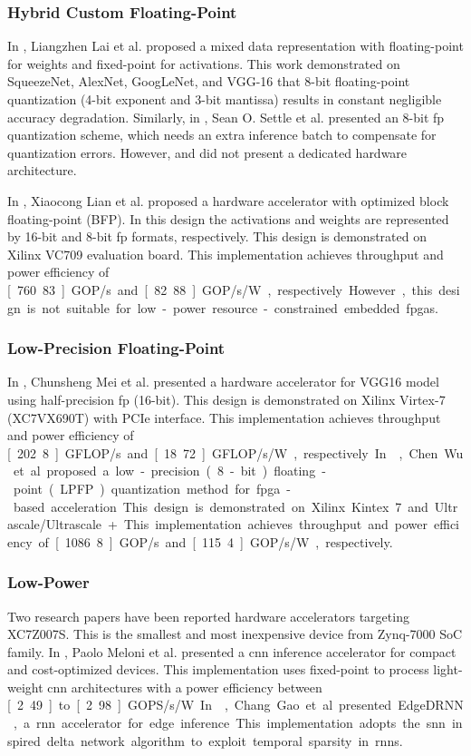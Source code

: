 \subsubsection{Hybrid Custom Floating-Point}
In \cite{lai2017deep}, Liangzhen Lai et al. proposed a mixed data representation with floating-point for weights and fixed-point for activations. This work demonstrated on SqueezeNet, AlexNet, GoogLeNet, and VGG-16 that 8-bit floating-point quantization (4-bit exponent and 3-bit mantissa) results in constant negligible accuracy degradation. Similarly, in \cite{settle2018quantizing}, Sean O. Settle et al. presented an 8-bit \gls{fp} quantization scheme, which needs an extra inference batch to compensate for quantization errors. However, \cite{lai2017deep} and \cite{settle2018quantizing} did not present a dedicated hardware architecture.

In \cite{lian2019high}, Xiaocong Lian et al. proposed a hardware accelerator with optimized block floating-point (BFP). In this design the activations and weights are represented by 16-bit and 8-bit \gls{fp} formats, respectively. This design is demonstrated on Xilinx VC709 evaluation board. This implementation achieves throughput and power efficiency of \unit[760.83]{GOP/s} and \unit[82.88]{GOP/s/W}, respectively. However, this design is not suitable for low-power resource-constrained embedded \glspl{fpga}.

\subsubsection{Low-Precision Floating-Point}
In \cite{mei2017200mhz}, Chunsheng Mei et al. presented a hardware accelerator for VGG16 model using half-precision \gls{fp} (16-bit). This design is demonstrated on Xilinx Virtex-7 (XC7VX690T) with PCIe interface. This implementation achieves throughput and power efficiency of \unit[202.8]{GFLOP/s} and \unit[18.72]{GFLOP/s/W}, respectively. In \cite{wu2021low}, Chen Wu et al. proposed a low-precision (8-bit) floating-point (LPFP) quantization method for \gls{fpga}-based acceleration. This design is demonstrated on Xilinx Kintex 7 and Ultrascale/Ultrascale+. This implementation achieves throughput and power efficiency of \unit[1086.8]{GOP/s} and \unit[115.4]{GOP/s/W}, respectively.

\subsubsection{Low-Power}
Two research papers have been reported hardware accelerators targeting XC7Z007S. This is the smallest and most inexpensive device from Zynq-7000 SoC family. In \cite{meloni2019cnn}, Paolo Meloni et al. presented a \gls{cnn} inference accelerator for compact and cost-optimized devices. This implementation uses fixed-point to process light-weight \gls{cnn} architectures with a power efficiency between \unit[2.49] to \unit[2.98]{GOPS/s/W}. In \cite{gao2020edgedrnn}, Chang Gao et al. presented EdgeDRNN, a \gls{rnn} accelerator for edge inference. This implementation adopts the \gls{snn} inspired delta network algorithm to exploit temporal sparsity in \glspl{rnn}.
